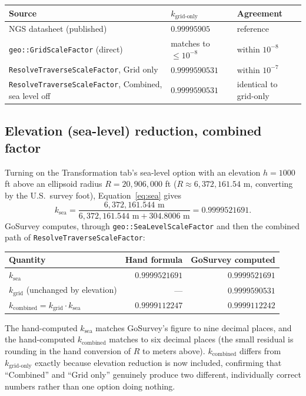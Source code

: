 \documentclass[11pt]{article}
\begin{document}
\begin{center}
\begin{tabular}{@{}L{0.46\textwidth}L{0.18\textwidth}L{0.22\textwidth}@{}}
\toprule
Source & $k_{\mathrm{grid\text{-}only}}$ & Agreement \\
\midrule
NGS datasheet (published) & $0.99995905$ & reference \\
\texttt{geo::GridScaleFactor} (direct) & matches to $\le 10^{-8}$ & within $10^{-8}$ \\
\texttt{ResolveTraverseScaleFactor}, Grid only & $0.9999590531$ & within $10^{-7}$ \\
\texttt{ResolveTraverseScaleFactor}, Combined, sea level off & $0.9999590531$ & identical to grid-only \\
\bottomrule
\end{tabular}
\end{center}

\subsection*{Elevation (sea-level) reduction, combined factor}

Turning on the Transformation tab's sea-level option with an elevation
$h = 1000$ ft above an ellipsoid radius $R = 20{,}906{,}000$ ft
($R \approx 6{,}372{,}161.54$ m, converting by the U.S.\ survey foot),
Equation~\ref{eq:sea} gives
\begin{equation}
k_{\mathrm{sea}} = \frac{6{,}372{,}161.544\text{ m}}
{6{,}372{,}161.544\text{ m} + 304.8006\text{ m}} = 0.9999521691.
\end{equation}
GoSurvey computes, through \texttt{geo::SeaLevelScaleFactor} and then the
combined path of \texttt{ResolveTraverseScaleFactor}:

\begin{center}
\begin{tabular}{@{}lrr@{}}
\toprule
Quantity & Hand formula & GoSurvey computed \\
\midrule
$k_{\mathrm{sea}}$ & $0.9999521691$ & $0.9999521691$ \\
$k_{\mathrm{grid}}$ (unchanged by elevation) & --- & $0.9999590531$ \\
$k_{\mathrm{combined}} = k_{\mathrm{grid}} \cdot k_{\mathrm{sea}}$ & $0.9999112247$ & $0.9999112242$ \\
\bottomrule
\end{tabular}
\end{center}

The hand-computed $k_{\mathrm{sea}}$ matches GoSurvey's figure to nine
decimal places, and the hand-computed $k_{\mathrm{combined}}$ matches to
six decimal places (the small residual is rounding in the hand conversion
of $R$ to meters above). $k_{\mathrm{combined}}$ differs from
$k_{\mathrm{grid\text{-}only}}$ exactly because elevation reduction is now
included, confirming that ``Combined'' and ``Grid only'' genuinely produce
two different, individually correct numbers rather than one option doing
nothing.
\end{document}
